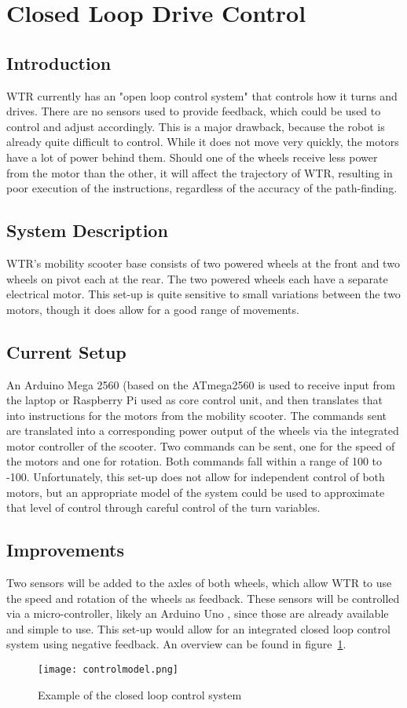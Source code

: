 \section{Closed Loop Drive Control}
\subsection{Introduction}
WTR currently has an "open loop control system" \cite{openloop} that controls how it turns and drives.
There are no sensors used to provide feedback, which could be used to control and adjust accordingly.
This is a major drawback, because the robot is already quite difficult to control.
While it does not move very quickly, the motors have a lot of power behind them.
Should one of the wheels receive less power from the motor than the other, it will affect the trajectory of WTR, resulting in poor execution of the instructions, regardless of the accuracy of the path-finding.

\subsection{System Description}
\label{subs::SysDes}
WTR's mobility scooter base consists of two powered wheels at the front and two wheels on pivot each at the rear.
The two powered wheels each have a separate electrical motor.
This set-up is quite sensitive to small variations between the two motors, though it does allow for a good range of movements.

\subsection{Current Setup}
An Arduino Mega 2560 (based on the ATmega2560 \cite{ardMega} is used to receive input from the laptop or Raspberry Pi used as core control unit, and then translates that into instructions for the motors from the mobility scooter.
The commands sent are translated into a corresponding power output of the wheels via the integrated motor controller of the scooter.
Two commands can be sent, one for the speed of the motors and one for rotation.
Both commands fall within a range of 100 to -100.
Unfortunately, this set-up does not allow for independent control of both motors, but an appropriate model of the system could be used to approximate that level of control through careful control of the turn variables.

\subsection{Improvements}
Two sensors will be added to the axles of both wheels, which allow WTR to use the speed and rotation of the wheels as feedback.
These sensors will be controlled via a micro-controller, likely an Arduino Uno \cite{ardUno}, since those are already available and simple to use.
This set-up would allow for an integrated closed loop control system using negative feedback.
An overview can be found in figure~\ref{fig::cllp}.
\begin{figure}[H]
\centering
\texttt{[image: controlmodel.png]}
\caption{Example of the closed loop control system}
\label{fig::cllp}
\end{figure}
\newpage

